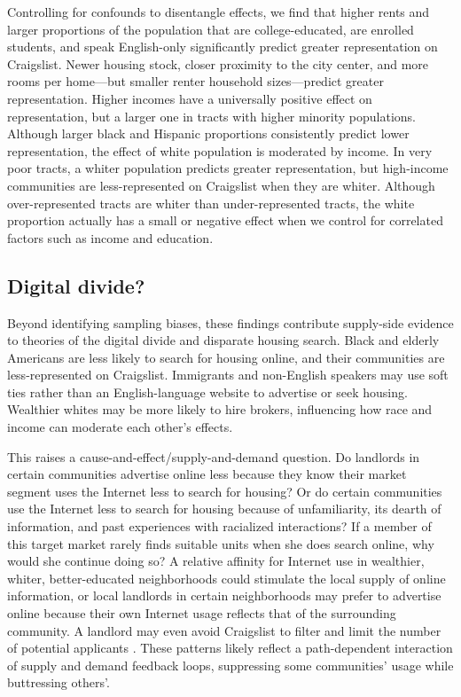 \documentclass[11pt,onecolumn]{article} %
\begin{document}
Controlling for confounds to disentangle effects, we find that higher rents and larger proportions of the population that are college-educated, are enrolled students, and speak English-only significantly predict greater representation on Craigslist. Newer housing stock, closer proximity to the city center, and more rooms per home---but smaller renter household sizes---predict greater representation. Higher incomes have a universally positive effect on representation, but a larger one in tracts with higher minority populations. Although larger black and Hispanic proportions consistently predict lower representation, the effect of white population is moderated by income. In very poor tracts, a whiter population predicts greater representation, but high-income communities are less-represented on Craigslist when they are whiter. Although over-represented tracts are whiter than under-represented tracts, the white proportion actually has a small or negative effect when we control for correlated factors such as income and education.

\subsection{Digital divide?}

Beyond identifying sampling biases, these findings contribute supply-side evidence to theories of the digital divide and disparate housing search. Black and elderly Americans are less likely to search for housing online, and their communities are less-represented on Craigslist. Immigrants and non-English speakers may use soft ties rather than an English-language website to advertise or seek housing. Wealthier whites may be more likely to hire brokers, influencing how race and income can moderate each other's effects.

This raises a cause-and-effect/supply-and-demand question. Do landlords in certain communities advertise online less because they know their market segment uses the Internet less to search for housing? Or do certain communities use the Internet less to search for housing because of unfamiliarity, its dearth of information, and past experiences with racialized interactions? If a member of this target market rarely finds suitable units when she does search online, why would she continue doing so? A relative affinity for Internet use in wealthier, whiter, better-educated neighborhoods could stimulate the local supply of online information, or local landlords in certain neighborhoods may prefer to advertise online because their own Internet usage reflects that of the surrounding community. A landlord may even avoid Craigslist to filter and limit the number of potential applicants \citep{mendez_professional_2016}. These patterns likely reflect a path-dependent interaction of supply and demand feedback loops, suppressing some communities' usage while buttressing others'.
\end{document}
